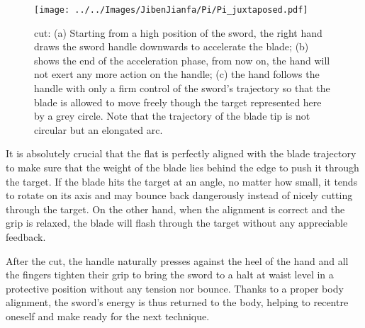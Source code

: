 \begin{figure}[ht]
\centering
	\texttt{[image: ../../Images/JibenJianfa/Pi/Pi\_juxtaposed.pdf]}
	\caption[\Pi{} cut]{\Pi{} cut: (a) Starting from a high position of the sword, the right hand draws the sword handle downwards to accelerate the blade; (b) shows the end of the acceleration phase, from now on, the hand will not exert any more action on the handle; (c) the hand follows the handle with only a firm control of the sword's trajectory so that the blade is allowed to move freely though the target represented here by a grey circle. Note that the trajectory of the blade tip is not circular but an elongated arc.}
	\label{fig:pi_cut}
\end{figure}

It is absolutely crucial that the flat is perfectly aligned with the blade trajectory to make sure that the weight of the blade lies behind the edge to push it through the target. If the blade hits the target at an angle, no matter how small, it tends to rotate on its axis and may bounce back dangerously instead of nicely cutting through the target. On the other hand, when the alignment is correct and the grip is relaxed, the blade will flash through the target without any appreciable feedback. 

After the cut, the handle naturally presses against the heel of the hand and all the fingers tighten their grip to bring the sword to a halt at waist level in a protective position without any tension nor bounce. Thanks to a proper body alignment, the sword's energy is thus returned to the body, helping to recentre oneself and make ready for the next technique.


